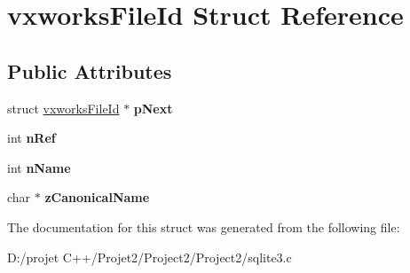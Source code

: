 \hypertarget{structvxworks_file_id}{}\section{vxworks\+File\+Id Struct Reference}
\label{structvxworks_file_id}
\subsection*{Public Attributes}
\begin{DoxyCompactItemize}
\item 
\mbox{\label{structvxworks_file_id_a1941104384e7aa1ad9d8574d091abe3a}} 
struct \mbox{\hyperlink{structvxworks_file_id}{vxworks\+File\+Id}} $\ast$ {\bfseries p\+Next}
\item 
\mbox{\label{structvxworks_file_id_a59dde49ee027786a06de8ad59b1d7883}} 
int {\bfseries n\+Ref}
\item 
\mbox{\label{structvxworks_file_id_af7ed9a749d73b74b534bc06baf1abf6d}} 
int {\bfseries n\+Name}
\item 
\mbox{\label{structvxworks_file_id_a032c9aaaa13ff100d9f3cd53926587fe}} 
char $\ast$ {\bfseries z\+Canonical\+Name}
\end{DoxyCompactItemize}


The documentation for this struct was generated from the following file\+:\begin{DoxyCompactItemize}
\item 
D\+:/projet C++/\+Projet2/\+Project2/\+Project2/sqlite3.\+c\end{DoxyCompactItemize}
